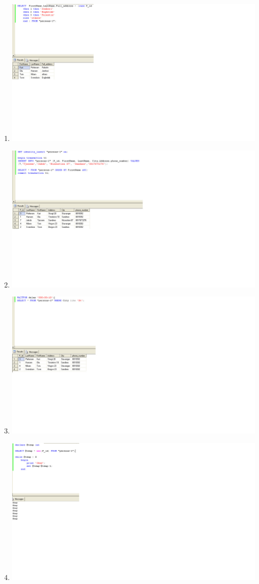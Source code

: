\documentclass{article}
\begin{document}
\begin{enumerate}
\begin{enumerate}
			\item
				\includegraphics[scale=0.5]{figs/im-5.jpg}
			\item
				\includegraphics[scale=0.5]{figs/im-6.jpg}
			\item
				\includegraphics[scale=0.5]{figs/im-7.jpg}
			\item
				\includegraphics[scale=0.5]{figs/im-8.jpg}

\end{enumerate}
\end{enumerate}
\end{document}
